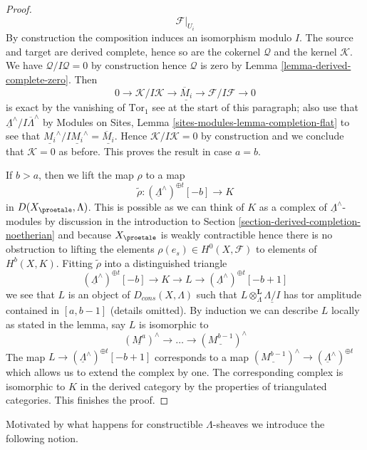 \begin{proof}
$$\mathcal{F}|_{U_i}
$$
By construction the composition induces an isomorphism modulo $I$.
The source and target are derived complete, hence so are the cokernel
$\mathcal{Q}$ and the kernel $\mathcal{K}$. We have
$\mathcal{Q}/I\mathcal{Q} = 0$ by construction hence $\mathcal{Q}$
is zero by Lemma \ref{lemma-derived-complete-zero}.
Then
$$
0 \to \mathcal{K}/I\mathcal{K} \to
\underline{\overline{M}_i}
\to \mathcal{F}/I\mathcal{F} \to 0
$$
is exact by the vanishing of $\text{Tor}_1$ see at the start of this
paragraph; also use that
$\underline{\Lambda}^\wedge/I\overline{\Lambda}^\wedge$ by
Modules on Sites, Lemma \ref{sites-modules-lemma-completion-flat}
to see that
$\underline{M_i}^\wedge/I\underline{M_i}^\wedge = \underline{\overline{M}_i}$.
Hence $\mathcal{K}/I\mathcal{K} = 0$ by construction and we conclude
that $\mathcal{K} = 0$ as before. This proves the result in case $a = b$.

\medskip\noindent
If $b > a$, then we lift the map $\rho$ to a map
$$
\tilde \rho : (\underline{\Lambda}^\wedge)^{\oplus t}[-b] \longrightarrow K
$$
in $D(X_\proetale, \Lambda)$. This is possible as we can think of
$K$ as a complex of $\underline{\Lambda}^\wedge$-modules by
discussion in the introduction to
Section \ref{section-derived-completion-noetherian}
and because $X_\proetale$ is weakly contractible
hence there is no obstruction to lifting the elements
$\rho(e_s) \in H^0(X, \mathcal{F})$ to elements of $H^b(X, K)$.
Fitting $\tilde \rho$ into a distinguished triangle
$$
(\underline{\Lambda}^\wedge)^{\oplus t}[-b] \to K \to L \to
(\underline{\Lambda}^\wedge)^{\oplus t}[-b + 1]
$$
we see that $L$ is an object of $D_{cons}(X, \Lambda)$ such
that $L \otimes_\Lambda^\mathbf{L} \underline{\Lambda/I}$
has tor amplitude contained in $[a, b - 1]$ (details omitted).
By induction we can describe $L$ locally as stated in the lemma, say
$L$ is isomorphic to
$$
(\underline{M^a})^\wedge \to \ldots \to (\underline{M^{b - 1}})^\wedge
$$
The map
$L \to (\underline{\Lambda}^\wedge)^{\oplus t}[-b + 1]$
corresponds to a map
$(\underline{M^{b - 1}})^\wedge \to (\underline{\Lambda}^\wedge)^{\oplus t}$
which allows us to extend the complex by one. The corresponding
complex is isomorphic to $K$ in the derived category by the properties
of triangulated categories. This finishes the proof.
\end{proof}

\noindent
Motivated by what happens for constructible $\Lambda$-sheaves
we introduce the following notion.

